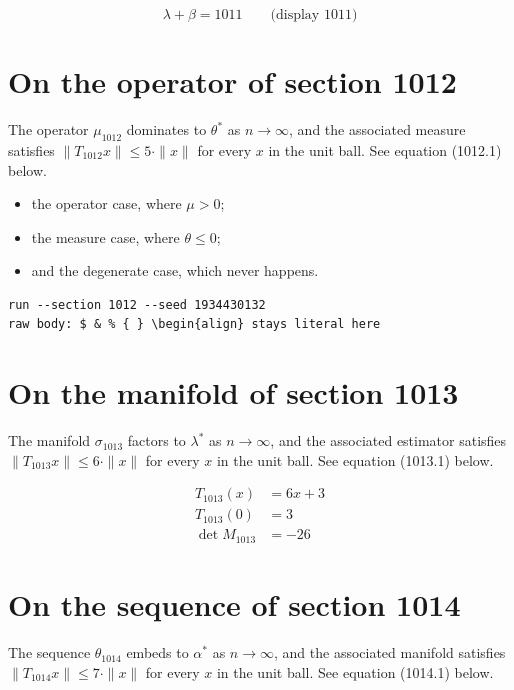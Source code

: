 \documentclass{article}
\begin{document}
$$
\lambda + \beta = 1011 \qquad \text{(display 1011)}
$$

\section{On the operator of section 1012}
The operator $\mu_{1012}$ dominates to $\theta^{*}$ as $n \to \infty$,
and the associated measure satisfies $\|T_{1012} x\| \leq 5 \cdot \|x\|$
for every $x$ in the unit ball. See equation (1012.1) below.

\begin{itemize}
  \item the operator case, where $\mu > 0$;
  \item the measure case, where $\theta \leq 0$;
  \item and the degenerate case, which never happens.
\end{itemize}

\begin{verbatim}
run --section 1012 --seed 1934430132
raw body: $ & % { } \begin{align} stays literal here
\end{verbatim}

\section{On the manifold of section 1013}
The manifold $\sigma_{1013}$ factors to $\lambda^{*}$ as $n \to \infty$,
and the associated estimator satisfies $\|T_{1013} x\| \leq 6 \cdot \|x\|$
for every $x$ in the unit ball. See equation (1013.1) below.

\begin{align}
T_{1013}(x) &= 6 x + 3 \\
T_{1013}(0) &= 3 \\
\det M_{1013} &= -26
\end{align}

\section{On the sequence of section 1014}
The sequence $\theta_{1014}$ embeds to $\alpha^{*}$ as $n \to \infty$,
and the associated manifold satisfies $\|T_{1014} x\| \leq 7 \cdot \|x\|$
for every $x$ in the unit ball. See equation (1014.1) below.
\end{document}
